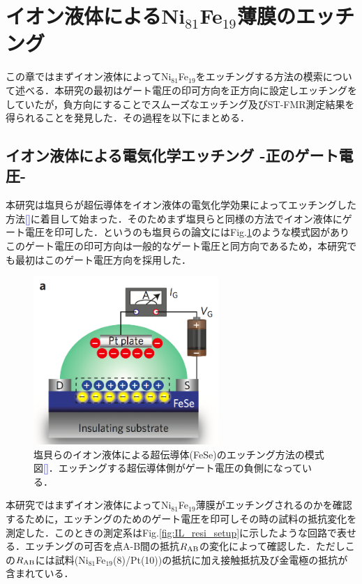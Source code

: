 \section{イオン液体によるNi$_{81}$Fe$_{19}$薄膜のエッチング}
\label{sec:PyPt}
この章ではまずイオン液体によってNi$_{81}$Fe$_{19}$をエッチングする方法の模索について述べる．本研究の最初はゲート電圧の印可方向を正方向に設定しエッチングをしていたが，負方向にすることでスムーズなエッチング及びST-FMR測定結果を得られることを発見した．その過程を以下にまとめる．

\subsection{イオン液体による電気化学エッチング -正のゲート電圧-}
本研究は塩貝らが超伝導体をイオン液体の電気化学効果によってエッチングした方法\textcolor{blue}{[]}に着目して始まった．そのためまず塩貝らと同様の方法でイオン液体にゲート電圧を印可した．というのも塩貝らの論文にはFig.\ref{fig:shiogai}のような模式図がありこのゲート電圧の印可方向は一般的なゲート電圧と同方向であるため，本研究でも最初はこのゲート電圧方向を採用した．

\begin{figure}[htbp]
\centerline{
\includegraphics[width=7cm]{images/shiogaireport.png}
}
\caption{塩貝らのイオン液体による超伝導体(FeSe)のエッチング方法の模式図\textcolor{blue}{[]}．エッチングする超伝導体側がゲート電圧の負側になっている．
}
\label{fig:shiogai} 
\end{figure}

本研究ではまずイオン液体によってNi$_{81}$Fe$_{19}$薄膜がエッチングされるのかを確認するために，エッチングのためのゲート電圧を印可しその時の試料の抵抗変化を測定した．このときの測定系はFig.\ref{fig:IL_resi_setup}に示したような回路で表せる．エッチングの可否を点A-B間の抵抗$R_{\rm AB}$の変化によって確認した．ただしこの$R_{\rm AB}$には試料(Ni$_{81}$Fe$_{19}$(8)/Pt(10))の抵抗に加え接触抵抗及び金電極の抵抗が含まれている．

